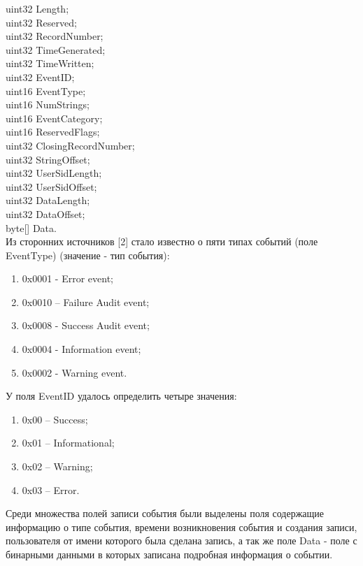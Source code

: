 uint32 Length; \\
uint32 Reserved; \\
uint32 RecordNumber; \\
uint32 TimeGenerated; \\
uint32 TimeWritten; \\
uint32 EventID; \\
uint16 EventType; \\
uint16 NumStrings; \\
uint16 EventCategory; \\
uint16 ReservedFlags; \\
uint32 ClosingRecordNumber; \\
uint32 StringOffset; \\
uint32 UserSidLength; \\
uint32 UserSidOffset; \\
uint32 DataLength; \\
uint32 DataOffset; \\
byte[] Data. \\

Из сторонних источников [2] стало известно о пяти типах событий (поле EventType) (значение - тип события):

\begin{enumerate}
\item 0x0001 - Error event;
\item 0x0010 – Failure Audit event;
\item 0x0008 - Success Audit event;
\item 0x0004 - Information event;
\item 0x0002 - Warning event.
\end{enumerate}

У поля EventID удалось определить четыре значения: \\

\begin{enumerate}
\item 0x00 – Success; \\
\item 0x01 – Informational;\\
\item 0x02 – Warning; \\
\item 0x03 – Error. \\
\end{enumerate}

Среди множества полей записи события были выделены поля содержащие информацию о типе события, времени возникновения события и создания записи, пользователя от имени которого была сделана запись, а так же поле Data - поле с бинарными данными в которых записана подробная информация о событии.

